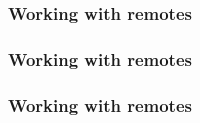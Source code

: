 \documentclass{beamer}
\begin{document}
    \begin{frame}
        \frametitle{Working with remotes}
        \begin{figure}[H]
            \centering
            \noindent
        \end{figure}
    \end{frame}
    \begin{frame}
        \frametitle{Working with remotes}
        \begin{figure}[H]
            \centering
            \noindent
        \end{figure}
    \end{frame}
    \begin{frame}
        \frametitle{Working with remotes}
        \begin{figure}[H]
            \centering
            \noindent
        \end{figure}
    \end{frame}
\end{document}
